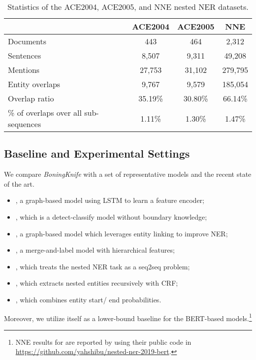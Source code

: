 \documentclass[11pt,a4paper]{article}
\begin{document}
\begin{table}[htbp]
\centering
\vskip 0.1in
\begin{tabular}{@{}lccc@{}}
\toprule
& ACE2004 & ACE2005 & NNE \\ \midrule
Documents & 443 & 464 & 2,312 \\
Sentences & 8,507 & 9,311 & 49,208 \\
Mentions  & 27,753 & 31,102 & 279,795 \\
Entity overlaps & 9,767 & 9,579 & 185,054 \\
Overlap ratio & 35.19\% & 30.80\% & 66.14\% \\
\% of overlaps over all sub-sequences & 1.11\% & 1.30\% & 1.47\% \\
\bottomrule
\end{tabular}\caption{Statistics of the ACE2004, ACE2005, and NNE nested NER datasets.}
\label{tab:stats_nested}
\end{table} 
\subsection{Baseline and Experimental Settings}
\label{sec:baseline}

We compare \textit{BoningKnife} with a set of representative models and the recent state of the art.

\begin{itemize}
\item \citet{wang2018neural}, a graph-based model using LSTM to learn a feature encoder;
\item \citet{xia2019multi}, which is a detect-classify model without boundary knowledge;
\item \citet{luan2019general}, a graph-based model which leverages entity linking to improve NER;
\item \citet{fisher2019merge}, a merge-and-label model with hierarchical features;
\item \citet{strakov2019neural}, which treats the nested NER task as a seq2seq problem;
\item \citet{shibuya2019nested}, which extracts nested entities recursively with CRF;
\item \citet{tan2020boundary}, which combines entity start/ end probabilities.
\end{itemize}

Moreover, we utilize  itself as a lower-bound baseline for the BERT-based models.\footnote{NNE results for \cite{shibuya2019nested} are reported by using their public code in \url{https://github.com/yahshibu/nested-ner-2019-bert}.}
\end{document}
